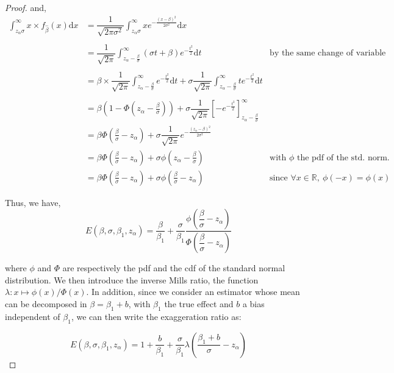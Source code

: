 \documentclass[a4paper, 11pt]{report}
\begin{document}
\begin{proof}
			and,
			~
			\begin{align*}
				 \int_{z_{\alpha}\sigma}^{\infty}x \times f_{\hat{\beta}} (x)\text{d}x
					& =  \dfrac{1}{\sqrt{2\pi \sigma^{2}}}\int_{z_{\alpha}\sigma}^{\infty} x  e^{-\frac{(x -\beta)^{2}}{2\sigma^{2}}} \text{d}x\\~\\
					& =  \dfrac{1}{\sqrt{2\pi }}\int_{z_{\alpha} - \frac{\beta}{\sigma}}^{\infty} ( \sigma t + \beta ) e^{-\frac{t^{2}}{2}} \text{d}t & \text{by the same change of variable}\\~\\
					& = \beta \times \dfrac{1}{\sqrt{2\pi }}\int_{z_{\alpha} - \frac{\beta}{\sigma}}^{\infty} e^{-\frac{t^{2}}{2}} \text{d}t  + \sigma \dfrac{1}{\sqrt{2\pi }}\int_{z_{\alpha} - \frac{\beta}{\sigma}}^{\infty} t e^{-\frac{t^{2}}{2}} \text{d}t 
					 \\~\\
					 & = \beta \left( 1 - \Phi\left( z_{\alpha} - \frac{\beta}{\sigma} \right)\right) + \sigma \dfrac{1}{\sqrt{2\pi }} \left[ - e^{-\frac{t^{2}}{2}}\right]^{\infty}_{z_{\alpha} - \frac{\beta}{\sigma} }\\
					& =  \beta \Phi\left( \frac{\beta}{\sigma} - z_{\alpha} \right) + \sigma \dfrac{1}{\sqrt{2\pi }} e^{-\frac{(z_{\alpha} - \beta)^{2}}{2\sigma^{2}}}\\
					& =  \beta \Phi\left( \frac{\beta}{\sigma} - z_{\alpha} \right) + \sigma \phi\left(z_{\alpha} - \frac{\beta}{\sigma} \right) & \text{with $\phi$ the pdf of the std. norm.}\\
					& =  \beta \Phi\left( \frac{\beta}{\sigma} - z_{\alpha} \right) + \sigma \phi\left(\frac{\beta}{\sigma} - z_{\alpha} \right) & \text{since } \forall x \in  \mathbb{R}, \ \phi(-x) = \phi(x)
			\end{align*}
			
			Thus, we have, 
			~
			\begin{equation*}
				E(\beta, \sigma, \beta_{1}, z_{\alpha}) = \dfrac{\beta}{\beta_{1}} + \dfrac{\sigma}{\beta_1} \dfrac{\phi\left( \dfrac{\beta}{\sigma} - z_{\alpha} \right)}{\Phi\left( \dfrac{\beta}{\sigma} - z_{\alpha} \right)}
			\end{equation*}
		
			where $\phi$ and $\Phi$ are respectively the pdf and the cdf of the standard normal distribution. We then introduce the inverse Mills ratio, the function $\lambda : x \mapsto \phi(x) / \Phi(x)$. In addition, since we consider an estimator whose mean can be decomposed in $\beta = \beta_{1} + b$, with $\beta_{1}$ the true effect and $b$ a bias independent of $\beta_{1}$, we can then write the exaggeration ratio as:
			
			\begin{equation*}
				\boxed{
					E(\beta, \sigma, \beta_{1}, z_{\alpha}) = 1 + \dfrac{b}{\beta_{1}}+ \dfrac{\sigma}{\beta_1} \lambda\left( \dfrac{\beta_{1} + b}{\sigma} - z_{\alpha} \right) 
				}
			\end{equation*}
		\end{proof}
			
\end{document}

